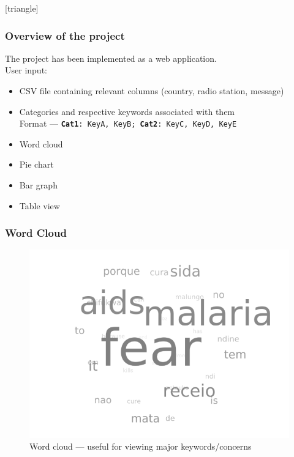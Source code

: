 \documentclass{beamer}
\begin{document}
\begin{frame}
[triangle]
\frametitle{Overview of the project}
The project has been implemented as a web application.\\
\pause
User input:
\pause
\begin{itemize}[<+->]
\item CSV file containing relevant columns (country, radio station, message)
\item Categories and respective keywords associated with them\\
Format --- {\tt {\bf Cat1}:\ KeyA, KeyB; {\bf Cat2}:\ KeyC, KeyD, KeyE}
\end{itemize}
\begin{itemize}[<+->]
\item Word cloud
\item Pie chart
\item Bar graph
\item Table view
\end{itemize}
\end{frame}

\begin{frame}
\frametitle{Word Cloud}
  \begin{figure}
    \centering
    \includegraphics[scale=0.3]{./word.png}
    \caption{Word cloud --- useful for viewing major keywords/concerns}
  \end{figure}
\end{frame}
\end{document}
